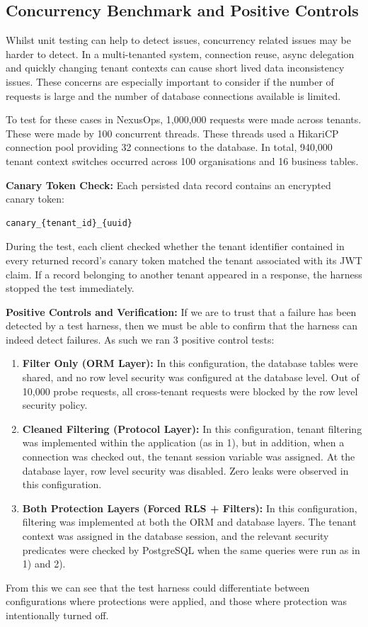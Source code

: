 \documentclass[conference]{IEEEtran}
\begin{document}
\subsection{Concurrency Benchmark and Positive Controls}
Whilst unit testing can help to detect issues, concurrency related issues may be harder to detect. In a multi-tenanted system, connection reuse, async delegation and quickly changing tenant contexts can cause short lived data inconsistency issues. These concerns are especially important to consider if the number of requests is large and the number of database connections available is limited.

To test for these cases in NexusOps, 1,000,000 requests were made across tenants. These were made by 100 concurrent threads. These threads used a HikariCP connection pool providing 32 connections to the database. In total, 940,000 tenant context switches occurred across 100 organisations and 16 business tables.

\textbf{Canary Token Check:} Each persisted data record contains an encrypted canary token:
\begin{lstlisting}
canary_{tenant_id}_{uuid}
\end{lstlisting}
During the test, each client checked whether the tenant identifier contained in every returned record's canary token matched the tenant associated with its JWT claim. If a record belonging to another tenant appeared in a response, the harness stopped the test immediately.

\textbf{Positive Controls and Verification:} If we are to trust that a failure has been detected by a test harness, then we must be able to confirm that the harness can indeed detect failures. As such we ran 3 positive control tests:
\begin{enumerate}
\item \textbf{Filter Only (ORM Layer):} In this configuration, the database tables were shared, and no row level security was configured at the database level. Out of 10,000 probe requests, all cross-tenant requests were blocked by the row level security policy.
\item \textbf{Cleaned Filtering (Protocol Layer):} In this configuration, tenant filtering was implemented within the application (as in 1), but in addition, when a connection was checked out, the tenant session variable was assigned. At the database layer, row level security was disabled. Zero leaks were observed in this configuration.
\item \textbf{Both Protection Layers (Forced RLS + Filters):} In this configuration, filtering was implemented at both the ORM and database layers. The tenant context was assigned in the database session, and the relevant security predicates were checked by PostgreSQL when the same queries were run as in 1) and 2).
\end{enumerate}
From this we can see that the test harness could differentiate between configurations where protections were applied, and those where protection was intentionally turned off.
\end{document}
